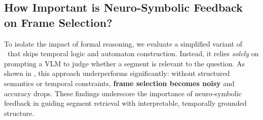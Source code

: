 \documentclass[letterpaper]{article} %
\begin{document}
    \begin{table}[t]
        \centering
        \caption{\textbf{Impact of frame sampling strategy.} Trimming to relevant segments with \nsvqa\ yields the highest accuracy (+9.77\%) over the full-video baseline, driven by a substantial increase in correct predictions (+18.42\%) and a moderate rise in regressions (+9.65\%). Dynamic scaling and speed bias strategies offer intermediate trade-offs, illustrating the balance between context retention and focus.}
        \vspace{-1em}
        \label{tab:frame_presentation_ablation}
    \end{table}


    \subsection{How Important is Neuro-Symbolic Feedback on Frame Selection?}
    \label{sec:how-imp-neus}
        To isolate the impact of formal reasoning, we evaluate a simplified variant of \nsvqa\ that skips temporal logic and automaton construction. Instead, it relies \textit{solely} on prompting a VLM to judge whether a segment is relevant to the question. As shown in , this approach underperforms significantly: without structured semantics or temporal constraints, \textbf{frame selection becomes noisy} and accuracy drops. These findings underscore the importance of neuro-symbolic feedback in guiding segment retrieval with interpretable, temporally grounded structure. 
\end{document}
